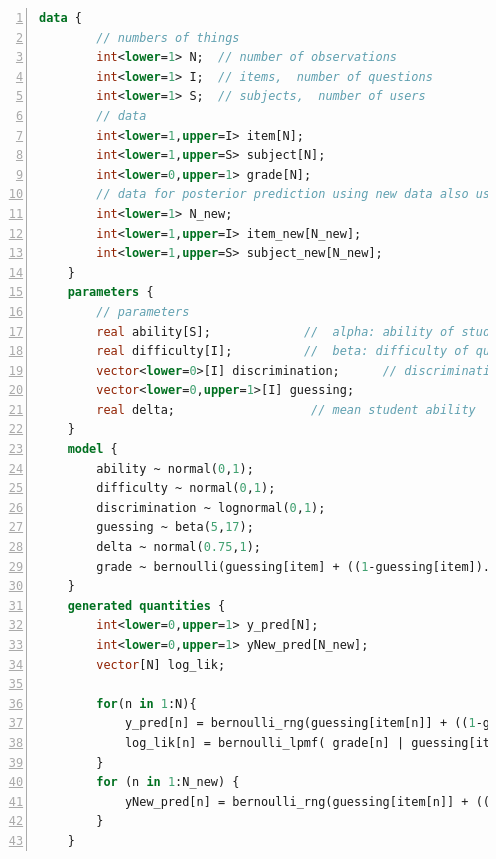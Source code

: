 \begin{lstlisting}[language=Stan,caption={Code Stan pour 3PL},basicstyle=\scriptsize, frame=lines,framesep=4.5mm,framexleftmargin=2.5mm,tabsize=2,numbers=left,fillcolor=\color{white},rulecolor=\color{black},numberstyle=\normalfont\scriptsize\color{black}]
    data {
        // numbers of things
        int<lower=1> N;  // number of observations
        int<lower=1> I;  // items,  number of questions  
        int<lower=1> S;  // subjects,  number of users 
        // data
        int<lower=1,upper=I> item[N];
        int<lower=1,upper=S> subject[N];
        int<lower=0,upper=1> grade[N];
        // data for posterior prediction using new data also used for Cross-validation
        int<lower=1> N_new;
        int<lower=1,upper=I> item_new[N_new];
        int<lower=1,upper=S> subject_new[N_new];
    }
    parameters {
        // parameters
        real ability[S];             //  alpha: ability of student
        real difficulty[I];          //  beta: difficulty of question
        vector<lower=0>[I] discrimination;      // discrimination of question
        vector<lower=0,upper=1>[I] guessing;    
        real delta;                   // mean student ability
    }
    model {
        ability ~ normal(0,1);         
        difficulty ~ normal(0,1);   
        discrimination ~ lognormal(0,1);
        guessing ~ beta(5,17);
        delta ~ normal(0.75,1);
        grade ~ bernoulli(guessing[item] + ((1-guessing[item]).*(inv_logit(discrimination[item] .* (ability[subject] - (difficulty[item] + delta))))));
    }
    generated quantities {
        int<lower=0,upper=1> y_pred[N];
        int<lower=0,upper=1> yNew_pred[N_new];
        vector[N] log_lik;

        for(n in 1:N){
            y_pred[n] = bernoulli_rng(guessing[item[n]] + ((1-guessing[item[n]]) * (inv_logit(discrimination[item[n]] .* (ability[subject[n]] - (difficulty[item[n]] + delta))))));
            log_lik[n] = bernoulli_lpmf( grade[n] | guessing[item[n]] + ((1-guessing[item[n]]) * (inv_logit(discrimination[item[n]] .* (ability[subject[n]] - (difficulty[item[n]] + delta))))));
        }
        for (n in 1:N_new) {
            yNew_pred[n] = bernoulli_rng(guessing[item[n]] + ((1-guessing[item[n]]) * (inv_logit(discrimination[item[n]] .* (ability[subject[n]] - (difficulty[item[n]] + delta))))));                                             
        }
    }
\end{lstlisting}

